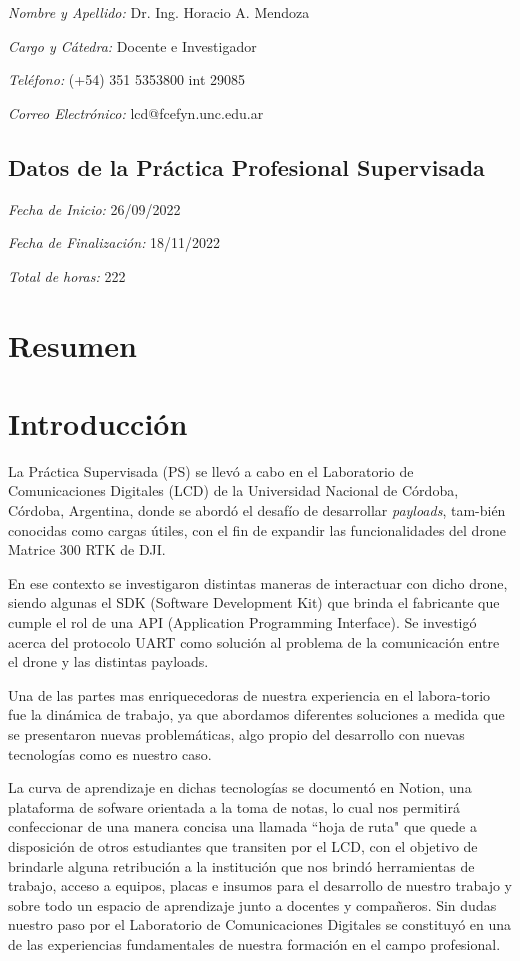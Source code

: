 \documentclass[12pt]{article}
\begin{document}
\textsl{Nombre y Apellido:} Dr. Ing. Horacio A. Mendoza

\textsl{Cargo y Cátedra:} Docente e Investigador

\textsl{Teléfono:} (+54) 351 5353800 int 29085

\textsl{Correo Electrónico:} lcd@fcefyn.unc.edu.ar

\subsection{Datos de la Práctica Profesional Supervisada}

\textsl{Fecha de Inicio:} 26/09/2022

\textsl{Fecha de Finalización:} 18/11/2022

\textsl{Total de horas:} 222

\tableofcontents
\newpage

\justifying
\section{Resumen}
\setlength\parindent{24pt}
\newpage
\section{Introducción}
La Práctica Supervisada (PS) se llevó a cabo en el Laboratorio de Comunicaciones Digitales (LCD) de la Universidad Nacional de Córdoba, Córdoba, Argentina, donde se abordó el desafío de desarrollar \textit{payloads}, tam-bién conocidas como cargas útiles, con el fin de expandir las funcionalidades del drone Matrice 300 RTK de DJI.

En ese contexto se investigaron distintas maneras de interactuar con dicho drone, siendo algunas el SDK (Software Development Kit) que brinda el fabricante que cumple el rol de una API (Application Programming Interface). Se investigó acerca del protocolo UART como solución al problema de la comunicación entre el drone y las distintas payloads.

Una de las partes mas enriquecedoras de nuestra experiencia en el labora-torio fue la dinámica de trabajo, ya que abordamos diferentes soluciones a medida que se presentaron nuevas problemáticas, algo propio del desarrollo con nuevas tecnologías como es nuestro caso. 

La curva de aprendizaje en dichas tecnologías se documentó en Notion, una plataforma de sofware orientada a la toma de notas, lo cual nos permitirá confeccionar de una manera concisa una llamada ``hoja de ruta"  que quede a disposición de otros estudiantes que transiten por el LCD, con el objetivo de brindarle alguna retribución a la institución que nos brindó herramientas de trabajo, acceso a equipos, placas e insumos para el desarrollo de nuestro trabajo y sobre todo un espacio de aprendizaje junto a docentes y compañeros. Sin dudas nuestro paso por el Laboratorio de Comunicaciones Digitales se constituyó en una de las experiencias fundamentales de nuestra formación en el campo profesional.
\end{document}

